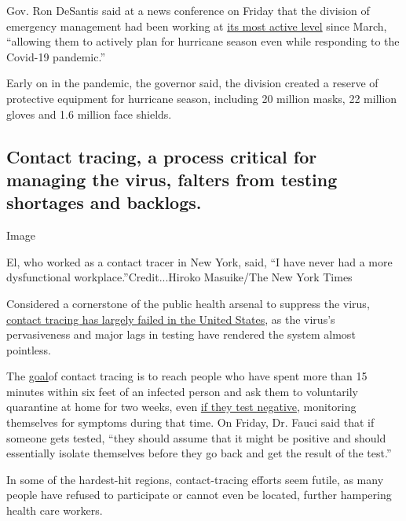Gov. Ron DeSantis said at a news conference on Friday that the division
of emergency management had been working at
\href{https://www.floridadisaster.org/sert/eoc-activation-levels/}{its
most active level} since March, ``allowing them to actively plan for
hurricane season even while responding to the Covid-19 pandemic.''

Early on in the pandemic, the governor said, the division created a
reserve of protective equipment for hurricane season, including 20
million masks, 22 million gloves and 1.6 million face shields.

\hypertarget{contact-tracing-a-process-critical-for-managing-the-virus-falters-from-testing-shortages-and-backlogs}{%
\subsection{Contact tracing, a process critical for managing the virus,
falters from testing shortages and
backlogs.}\label{contact-tracing-a-process-critical-for-managing-the-virus-falters-from-testing-shortages-and-backlogs}}

Image

El, who worked as a contact tracer in New York, said, ``I have never had
a more dysfunctional workplace.''Credit...Hiroko Masuike/The New York
Times

Considered a cornerstone of the public health arsenal to suppress the
virus,
\href{https://www.nytimes3xbfgragh.onion/2020/07/31/health/covid-contact-tracing-tests.html}{contact
tracing has largely failed in the United States}, as the virus's
pervasiveness and major lags in testing have rendered the system almost
pointless.

The
\href{https://www.cdc.gov/coronavirus/2019-ncov/php/contact-tracing/contact-tracing-plan/contact-tracing.html}{goal}of
contact tracing is to reach people who have spent more than 15 minutes
within six feet of an infected person and ask them to voluntarily
quarantine at home for two weeks, even
\href{https://www.cdc.gov/coronavirus/2019-ncov/symptoms-testing/testing.html}{if
they test negative}, monitoring themselves for symptoms during that
time. On Friday, Dr. Fauci said that if someone gets tested, ``they
should assume that it might be positive and should essentially isolate
themselves before they go back and get the result of the test.''

In some of the hardest-hit regions, contact-tracing efforts seem futile,
as many people have refused to participate or cannot even be located,
further hampering health care workers.

